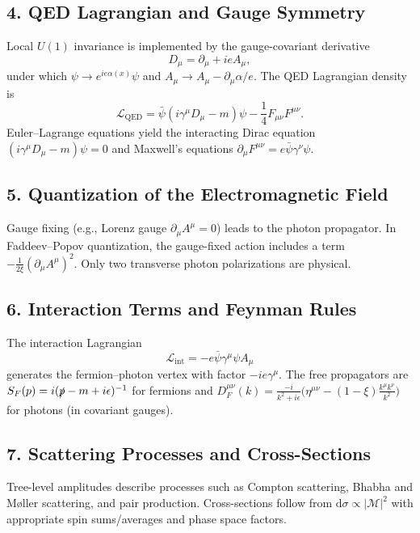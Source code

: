 \subsection*{4. QED Lagrangian and Gauge Symmetry}
Local $U(1)$ invariance is implemented by the gauge-covariant derivative
\begin{equation}
D_\mu = \partial_\mu + i e A_\mu ,
\end{equation}
under which $\psi \to e^{i e \alpha(x)}\psi$ and $A_\mu \to A_\mu - \partial_\mu \alpha/e$. The QED Lagrangian density is
\begin{equation}
\mathcal{L}_{\mathrm{QED}} = \bar{\psi}(i\gamma^\mu D_\mu - m)\psi - \frac{1}{4}F_{\mu\nu}F^{\mu\nu}.
\end{equation}
Euler--Lagrange equations yield the interacting Dirac equation $(i\gamma^\mu D_\mu - m)\psi=0$ and Maxwell's equations $\partial_\mu F^{\mu\nu} = e \bar{\psi}\gamma^\nu\psi$.

\subsection*{5. Quantization of the Electromagnetic Field}
Gauge fixing (e.g., Lorenz gauge $\partial_\mu A^\mu=0$) leads to the photon propagator. In Faddeev--Popov quantization, the gauge-fixed action includes a term $-\tfrac{1}{2\xi}(\partial_\mu A^\mu)^2$. Only two transverse photon polarizations are physical.

\subsection*{6. Interaction Terms and Feynman Rules}
The interaction Lagrangian
\begin{equation}
\mathcal{L}_{\mathrm{int}} = - e \bar{\psi}\gamma^\mu \psi A_\mu
\end{equation}
generates the fermion--photon vertex with factor $-i e \gamma^\mu$. The free propagators are $S_F(p)=i(\slashed{p}-m+i\epsilon)^{-1}$ for fermions and $D_F^{\mu\nu}(k)=\frac{-i}{k^2+i\epsilon}\Big(\eta^{\mu\nu}-(1-\xi)\frac{k^\mu k^\nu}{k^2}\Big)$ for photons (in covariant gauges).

\subsection*{7. Scattering Processes and Cross-Sections}
Tree-level amplitudes describe processes such as Compton scattering, Bhabha and M\o ller scattering, and pair production. Cross-sections follow from $\mathrm{d}\sigma \propto |\mathcal{M}|^2$ with appropriate spin sums/averages and phase space factors.

